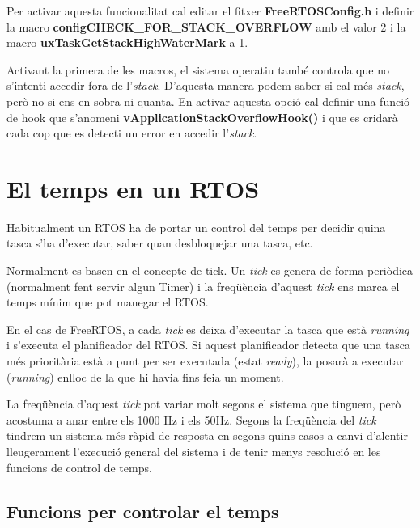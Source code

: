 Per activar aquesta funcionalitat cal editar el fitxer {\bf FreeRTOSConfig.h} i definir la macro {\bf configCHECK\_FOR\_STACK\_OVERFLOW} amb el valor 2 i la macro {\bf uxTaskGetStackHighWaterMark} a 1.

Activant la primera de les macros, el sistema operatiu també controla que no s'intenti accedir fora de l'{\em stack}. D'aquesta manera podem saber si cal més {\em stack}, però no si ens en sobra ni quanta. En activar aquesta opció cal definir una funció de hook que s'anomeni {\bf vApplicationStackOverflowHook()} i que es cridarà cada cop que es detecti un error en accedir l'{\em stack}.




\section{El temps en un RTOS}
\label{sec:RTOS_time}
Habitualment un RTOS ha de portar un control del temps per decidir quina tasca s'ha d'executar, saber quan desbloquejar una tasca, etc.

Normalment es basen en el concepte de \gls{tick}. Un {\em tick} es genera de forma periòdica (normalment fent servir algun Timer) i la freqüència d'aquest {\em tick} ens marca el temps mínim que pot manegar el RTOS.

En el cas de FreeRTOS, a cada {\em tick} es deixa d'executar la tasca que està {\em running} i s'executa el planificador del RTOS. Si aquest planificador detecta que una tasca més prioritària està a punt per ser executada (estat {\em ready}), la posarà a executar ({\em running}) enlloc de la que hi havia fins feia un moment.

La freqüència d'aquest {\em tick} pot variar molt segons el sistema que tinguem, però acostuma a anar entre els 1000 Hz i els 50Hz. Segons la freqüència del {\em tick} tindrem un sistema més ràpid de resposta en segons quins casos a canvi d'alentir lleugerament l'execució general del sistema i de tenir menys resolució en les funcions de control de temps.

\subsection{Funcions per controlar el temps}

